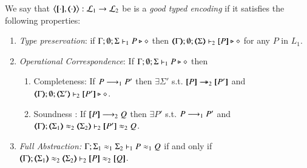 \begin{definition}
	\label{def:ep}
	We say that $\enc{\cdot}{\cdot} : \tyl{L}_1 \to \tyl{L}_2$ be is a \emph{good  typed encoding} if it satisfies the following properties:
	
	\begin{enumerate}[1.]
		\item \emph{Type preservation}:	%
		if
			$\Gamma; \emptyset; \Sigma \vdash_1 P \triangleright \diamond$ then $\mapt{\Gamma}; \emptyset; \mapt{\Sigma} \proves_2 \map{P} \hastype \Proc$ for any   $P$ in $L_1$.

		\item \emph{Operational Correspondence}: If $\Gamma; \emptyset; \Sigma \vdash_1 P \triangleright \diamond$ then
		\begin{enumerate}[-]
			\item	Completeness: If $P \longrightarrow_1 P'$ then $\exists \Sigma'$ s.t.
				$\map{P} \Red_2 \map{P'}$ and
				$\mapt{\Gamma}; \emptyset; \mapt{\Sigma'} \proves_2 \map{P'} \hastype \Proc$.
			\item Soundness : If $[\!\![P]\!\!] \longrightarrow_2 Q$ then
				$\exists P'$ s.t. $P \longrightarrow_1 P'$ and \\
				$\mapt{\Gamma}; \mapt{\Sigma_1} \wb_2 \mapt{\Sigma_2} \proves_2 \map{P'} \wb_2 Q$.
		\end{enumerate}
		
		\item \emph{Full Abstraction:} %
		$\Gamma; \Sigma_1 \approx_1 \Sigma_2 \vdash_1 P \approx_1 Q $ if and only if $\mapt{\Gamma}; \mapt{\Sigma_1} \wb_2 \mapt{\Sigma_2} \proves_2 \map{P} \wb_2 \map{Q} $.
	\end{enumerate}
\end{definition}


